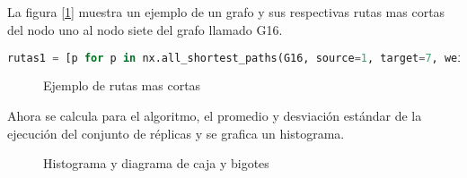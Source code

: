 \documentclass[a4paper, 11pt]{article}
\begin{document}
\subsection*{}

La figura [\ref{figure7}] muestra un ejemplo de un grafo y sus respectivas rutas mas cortas del nodo uno al nodo siete del grafo llamado G16.

\begin{lstlisting}[language=Python]
rutas1 = [p for p in nx.all_shortest_paths(G16, source=1, target=7, weight=None,method='dijkstra')]

\end{lstlisting}

\begin{figure}[H]
\centering
{}
\caption{Ejemplo de rutas mas cortas} \label{figure7}
\end{figure}

Ahora se calcula para el algoritmo, el promedio y desviación estándar de la ejecución del conjunto de réplicas y se grafica un histograma.

\begin{figure}[H]
\centering
{}
\caption{Histograma y diagrama de caja y bigotes} \label{figure8}
\end{figure}
\end{document}

